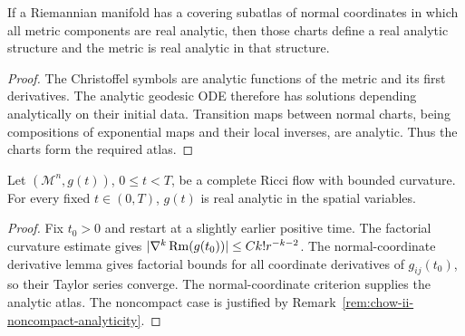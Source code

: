 \begin{lemma}
\label{lem:chow-ii-normal-coordinate-analytic-atlas}
If a Riemannian manifold has a covering subatlas of normal coordinates in
which all metric components are real analytic, then those charts define a
real analytic structure and the metric is real analytic in that structure.
\end{lemma}
\begin{proof}
The Christoffel symbols are analytic functions of the metric and its first
derivatives.  The analytic geodesic ODE therefore has solutions depending
analytically on their initial data.  Transition maps between normal charts,
being compositions of exponential maps and their local inverses, are
analytic.  Thus the charts form the required atlas.
\end{proof}

\begin{theorem}
\label{thm:chow-ii-ricci-flow-spatial-real-analyticity}
Let \((\mathcal M^n,g(t))\), \(0\leq t<T\), be a complete Ricci flow with
bounded curvature.  For every fixed \(t\in(0,T)\), \(g(t)\) is real analytic
in the spatial variables.
\end{theorem}
\begin{proof}
Fix \(t_0>0\) and restart at a slightly earlier positive time.  The factorial
curvature estimate gives \(|\nabla^k\operatorname{Rm}(g(t_0))|\leq Ck!r^{-k-2}\).  The
normal-coordinate derivative lemma gives factorial bounds for all coordinate
derivatives of \(g_{ij}(t_0)\), so their Taylor series converge.  The
normal-coordinate criterion supplies the analytic atlas.  The noncompact
case is justified by Remark~\ref{rem:chow-ii-noncompact-analyticity}.
\end{proof}

